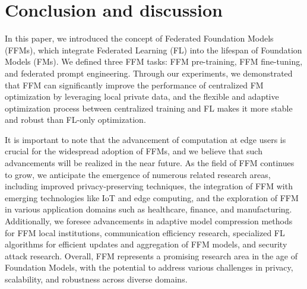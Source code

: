 \section{Conclusion and discussion}

In this paper, we introduced the concept of Federated Foundation Models (FFMs), which integrate Federated Learning (FL) into the lifespan of Foundation Models (FMs). We defined three FFM tasks: FFM pre-training, FFM fine-tuning, and federated prompt engineering. Through our experiments, we demonstrated that FFM can significantly improve the performance of centralized FM optimization by leveraging local private data, and the flexible and adaptive optimization process between centralized training and FL makes it more stable and robust than FL-only optimization.

It is important to note that the advancement of computation at edge users is crucial for the widespread adoption of FFMs, and we believe that such advancements will be realized in the near future. As the field of FFM continues to grow, we anticipate the emergence of numerous related research areas, including improved privacy-preserving techniques, the integration of FFM with emerging technologies like IoT and edge computing, and the exploration of FFM in various application domains such as healthcare, finance, and manufacturing.
Additionally, we foresee advancements in adaptive model compression methods for FFM local institutions, communication efficiency research, specialized FL algorithms for efficient updates and aggregation of FFM models, and security attack research. Overall, FFM represents a promising research area in the age of Foundation Models, with the potential to address various challenges in privacy, scalability, and robustness across diverse domains.






